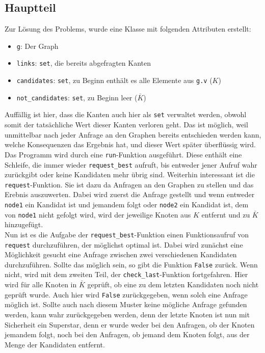 \documentclass[a4paper,10pt,ngerman]{scrartcl}
\begin{document}
\subsection{Hauptteil}
Zur L\"osung des Problems, wurde eine Klasse mit folgenden Attributen erstellt:
\begin{itemize}
  \item \texttt{g}: Der Graph
  \item \texttt{links}: \texttt{set}, die bereits abgefragten Kanten
  \item \texttt{candidates}: \texttt{set}, zu Beginn enth\"alt es alle Elemente aus \texttt{g.v} ($K$)
  \item \texttt{not\_candidates}: \texttt{set}, zu Beginn leer ($\bar{K}$)
\end{itemize}
Auff\"allig ist hier, dass die Kanten auch hier als \texttt{set} verwaltet werden, obwohl
somit der tats\"achliche Wert dieser Kanten verloren geht. Das ist m\"oglich, weil unmittelbar
nach jeder Anfrage an den Graphen bereits entschieden werden kann, welche Konsequenzen das
Ergebnis hat, und dieser Wert sp\"ater \"uberfl\"ussig wird.\\
\indent Das Programm wird durch eine \texttt{run}-Funktion ausgef\"uhrt. Diese enth\"alt
eine Schleife, die immer wieder \texttt{request\_best} aufruft, bis entweder jener Aufruf
wahr zur\"uckgibt oder keine Kandidaten mehr \"ubrig sind.
\indent Weiterhin interessant ist die \texttt{request}-Funktion. Sie ist dazu da Anfragen
an den Graphen zu stellen und das Erebnis auszuwerten. Dabei wird zuerst die Anfrage gestellt
und wenn entweder \texttt{node1} ein Kandidat ist und jemandem folgt oder \texttt{node2}
ein Kandidat ist, dem von \texttt{node1} nicht gefolgt wird, wird der jeweilige Knoten
aus $K$ entfernt und zu $\bar{K}$ hinzugef\"ugt.\\
\indent Nun ist es die Aufgabe der \texttt{request\_best}-Funktion einen Funktionsaufruf 
von \texttt{request} durchzuf\"uhren, der m\"oglichst optimal ist. Dabei wird zun\"achst
eine M\"oglichkeit gesucht eine Anfrage zwischen zwei verschiedenen Kandidaten 
durchzuf\"uhren. Sollte das m\"oglich sein, so gibt die Funktion \texttt{False} zur\"uck. Wenn nicht,
wird mit dem zweiten Teil, der \texttt{check\_last}-Funktion fortgefahren. Hier wird f\"ur
alle Knoten in $\bar{K}$ gepr\"uft, ob eine zu dem letzten Kandidaten noch nicht gepr\"uft
wurde. Auch hier wird \texttt{False} zur\"uckgegeben, wenn solch eine Anfrage m\"oglich
ist. Sollte auch nach diesem Muster keine m\"ogliche Anfrage gefunden werden, kann wahr
zur\"uckgegeben werden, denn der letzte Knoten ist nun mit Sicherheit ein Superstar, denn
er wurde weder bei den Anfragen, ob der Knoten jemandem folgt, noch bei den Anfragen, ob
jemand dem Knoten folgt, aus der Menge der Kandidaten entfernt.
\end{document}
